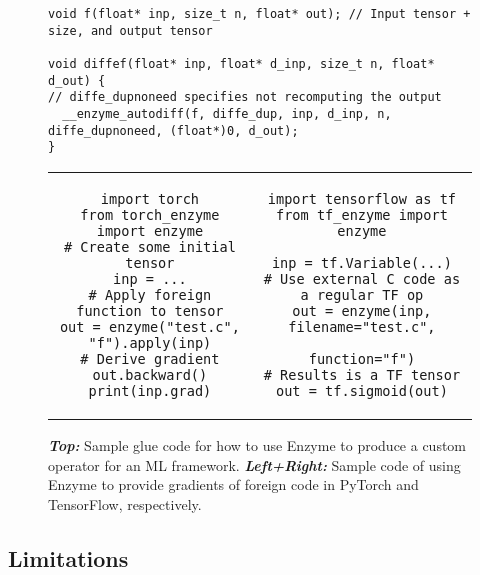\begin{figure}
    \centering
    \begin{verbatim}
void f(float* inp, size_t n, float* out); // Input tensor + size, and output tensor

void diffef(float* inp, float* d_inp, size_t n, float* d_out) {
// diffe_dupnoneed specifies not recomputing the output
  __enzyme_autodiff(f, diffe_dup, inp, d_inp, n, diffe_dupnoneed, (float*)0, d_out);
}
\end{verbatim}
\begin{tabular}{c|c}
\begin{minipage}[T]{0.46\linewidth}
\begin{verbatim}
import torch
from torch_enzyme import enzyme
# Create some initial tensor
inp = ...
# Apply foreign function to tensor
out = enzyme("test.c", "f").apply(inp)
# Derive gradient
out.backward()
print(inp.grad)
\end{verbatim}
\end{minipage}& \begin{minipage}[T]{0.53\linewidth}
\begin{verbatim}
import tensorflow as tf
from tf_enzyme import enzyme

inp = tf.Variable(...)
# Use external C code as a regular TF op
out = enzyme(inp, filename="test.c",
                  function="f")
# Results is a TF tensor
out = tf.sigmoid(out)
\end{verbatim}
\end{minipage}
\end{tabular}
    \caption{\textbf{\textit{Top:}} Sample glue code for how to use Enzyme to produce a custom operator for an ML framework. \textbf{\textit{Left+Right:}}
    Sample code of using Enzyme to provide gradients of foreign code in PyTorch and TensorFlow, respectively.}
    \label{fig:mlframeworks}
\end{figure}


\subsection{Limitations}
